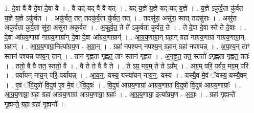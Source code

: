 \documentclass[17pt]{extarticle}
\begin{document}
1. दे॒वा वै वै दे॒वा दे॒वा वै । . वै यद् यद् वै वै यत् । . यद् य॒ज्ञे य॒ज्ञे यद् यद् य॒ज्ञे । . य॒ज्ञे ऽकु॑र्व॒ता कु॑र्वत य॒ज्ञे य॒ज्ञे ऽकु॑र्वत । . अकु॑र्वत॒ तत् तदकु॑र्व॒ता कु॑र्वत॒ तत् । . तदसु॑रा॒ असु॑रा॒ स्तत् तदसु॑राः । . असु॑रा अकुर्वता कुर्व॒ता सु॑रा॒ असु॑रा अकुर्वत । . अ॒कु॒र्व॒त॒ ते ते॑ ऽकुर्वता कुर्वत॒ ते । . ते दे॒वा दे॒वा स्ते ते दे॒वाः । . दे॒वा आ᳚ग्रय॒णाग्रा॑ नाग्रय॒णाग्रा᳚न् दे॒वा दे॒वा आ᳚ग्रय॒णाग्रान्॑ । . आ॒ग्र॒य॒णाग्रा॒न् ग्रहा॒न् ग्रहा॑ नाग्रय॒णाग्रा॑ नाग्रय॒णाग्रा॒न् ग्रहान्॑ । . आ॒ग्र॒य॒णाग्रा॒नित्या᳚ग्रय॒ण - अ॒ग्रा॒न् । . ग्रहा॑ नपश्यन् नपश्य॒न् ग्रहा॒न् ग्रहा॑ नपश्यन्न् । . अ॒प॒श्य॒न् ताꣳ स्तान॑ पश्यन्न पश्य॒न् तान् । . तान॑ गृह्णता गृह्णत॒ ताꣳ स्तान॑ गृह्णत । . अ॒गृ॒ह्ण॒त॒ तत॒ स्ततो॑ ऽगृह्णता गृह्णत॒ ततः॑ । . ततो॒ वै वै तत॒ स्ततो॒ वै । . वै ते ते वै वै ते । . ते ऽग्र॒ मग्र॒म् ते ते ऽग्र᳚म् । . अग्र॒म् परि॒ पर्यग्र॒ मग्र॒म् परि॑ । . पर्या॑यन् नाय॒न् परि॒ पर्या॑यन्न् । . आ॒य॒न्॒. यस्य॒ यस्या॑यन् नाय॒न्॒. यस्य॑ । . यस्यै॒व मे॒वं ॅयस्य॒ यस्यै॒वम् । . ए॒वं ॅवि॒दुषो॑ वि॒दुष॑ ए॒व मे॒वं ॅवि॒दुषः॑ । . वि॒दुष॑ आग्रय॒णाग्रा॑ आग्रय॒णाग्रा॑ वि॒दुषो॑ वि॒दुष॑ आग्रय॒णाग्राः᳚ । . आ॒ग्र॒य॒णाग्रा॒ ग्रहा॒ ग्रहा॑ आग्रय॒णाग्रा॑ आग्रय॒णाग्रा॒ ग्रहाः᳚ । . आ॒ग्र॒य॒णाग्रा॒ इत्या᳚ग्रय॒ण - अ॒ग्राः॒ । . ग्रहा॑ गृ॒ह्यन्ते॑ गृ॒ह्यन्ते॒ ग्रहा॒ ग्रहा॑ गृ॒ह्यन्ते᳚ । \newline
\end{document}
